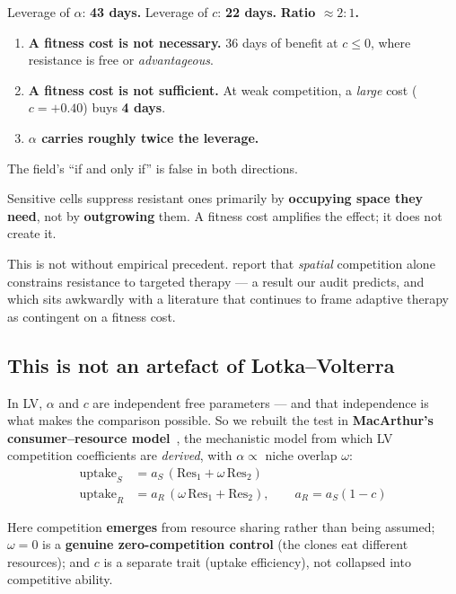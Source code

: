 \documentclass[11pt,a4paper]{article}
\begin{document}
Leverage of $\alpha$: \textbf{43 days.} Leverage of $c$: \textbf{22 days.}
\textbf{Ratio $\approx 2:1$.}

\begin{enumerate}[leftmargin=1.6em,itemsep=0.3em]
\item \textbf{A fitness cost is not necessary.} 36 days of benefit at $c \leq 0$,
where resistance is free or \emph{advantageous}.
\item \textbf{A fitness cost is not sufficient.} At weak competition, a \emph{large}
cost ($c = +0.40$) buys \textbf{4 days}.
\item \textbf{$\alpha$ carries roughly twice the leverage.}
\end{enumerate}

The field's ``if and only if'' is false in both directions.

\begin{tcolorbox}[keybox]
Sensitive cells suppress resistant ones primarily by \textbf{occupying space they
need}, not by \textbf{outgrowing} them. A fitness cost amplifies the effect; it does
not create it.
\end{tcolorbox}

This is not without empirical precedent. \citet{bacevic2017spatial} report that
\emph{spatial} competition alone constrains resistance to targeted therapy --- a
result our audit predicts, and which sits awkwardly with a literature that continues
to frame adaptive therapy as contingent on a fitness cost.

\subsection{This is not an artefact of Lotka--Volterra}

In LV, $\alpha$ and $c$ are independent free parameters --- and that independence is
what makes the comparison possible. So we rebuilt the test in \textbf{MacArthur's consumer--resource
model}~\citep{macarthur1970species}, the mechanistic model from which LV competition
coefficients are \emph{derived}, with $\alpha \propto$ niche overlap $\omega$:
\begin{align}
\mathrm{uptake}_S &= a_S\,(\mathrm{Res}_1 + \omega\,\mathrm{Res}_2)\\
\mathrm{uptake}_R &= a_R\,(\omega\,\mathrm{Res}_1 + \mathrm{Res}_2), \qquad a_R = a_S(1-c)
\end{align}

Here competition \textbf{emerges} from resource sharing rather than being assumed;
$\omega = 0$ is a \textbf{genuine zero-competition control} (the clones eat
different resources); and $c$ is a separate trait (uptake efficiency), not collapsed
into competitive ability.
\end{document}
